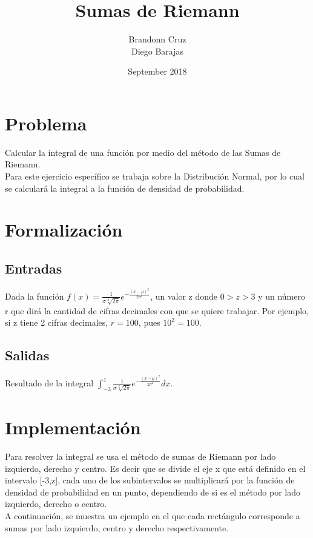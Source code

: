 \documentclass{article}
\title{Sumas de Riemann}
\author{Brandonn Cruz\\Diego Barajas}
\date{September 2018}
\begin{document}
\maketitle

\section{Problema}
Calcular la integral de una función por medio del método de las Sumas de Riemann.\\
Para este ejercicio específico se trabaja sobre la Distribución Normal, por lo cual se calculará la integral a la función de densidad de probabilidad.

\section{Formalización}
\subsection{Entradas}
Dada la función $f(x) = \frac{1}{\sigma\sqrt[2]{2\pi}}e^{-\frac{(x-\mu)^2}{2 \sigma^2}}$, un valor z donde $0 > z > 3$ y un número r que dirá la cantidad de cifras decimales con que se quiere trabajar. Por ejemplo, si z tiene 2 cifras decimales, $r = 100$, pues $10^2 = 100$.
\subsection{Salidas}
Resultado de la integral $\int_{-3}^{z}\frac{1}{\sigma\sqrt[2]{2\pi}}e^{-\frac{(x-\mu)^2}{2 \sigma^2}}dx$.

\section{Implementación}
Para resolver la integral se usa el método de sumas de Riemann por lado izquierdo, derecho y centro. Es decir que se divide el eje x que está definido en el intervalo [-3,z], cada uno de los subintervalos se multiplicará por la función de densidad de probabilidad en un punto, dependiendo de si es el método por lado izquierdo, derecho o centro.\\
A continuación, se muestra un ejemplo en el que cada rectángulo corresponde a sumas por lado izquierdo, centro y derecho respectivamente.
\end{document}

